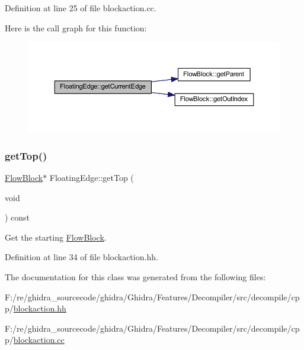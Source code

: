 Definition at line 25 of file blockaction.\+cc.

Here is the call graph for this function\+:
\nopagebreak
\begin{figure}[H]
\begin{center}
\leavevmode
\includegraphics[width=350pt]{class_floating_edge_afe06b54ef60e438326f48f0d466df0ff_cgraph}
\end{center}
\end{figure}
\mbox{\label{class_floating_edge_aca226310bf8b5e65a4a34434814412d0}} 
\subsubsection{\texorpdfstring{getTop()}{getTop()}}
{\footnotesize\ttfamily \mbox{\hyperlink{class_flow_block}{Flow\+Block}}$\ast$ Floating\+Edge\+::get\+Top (\begin{DoxyParamCaption}\item[{void}]{ }\end{DoxyParamCaption}) const\hspace{0.3cm}{\ttfamily [inline]}}



Get the starting \mbox{\hyperlink{class_flow_block}{Flow\+Block}}. 



Definition at line 34 of file blockaction.\+hh.



The documentation for this class was generated from the following files\+:\begin{DoxyCompactItemize}
\item 
F\+:/re/ghidra\+\_\+sourcecode/ghidra/\+Ghidra/\+Features/\+Decompiler/src/decompile/cpp/\mbox{\hyperlink{blockaction_8hh}{blockaction.\+hh}}\item 
F\+:/re/ghidra\+\_\+sourcecode/ghidra/\+Ghidra/\+Features/\+Decompiler/src/decompile/cpp/\mbox{\hyperlink{blockaction_8cc}{blockaction.\+cc}}\end{DoxyCompactItemize}
